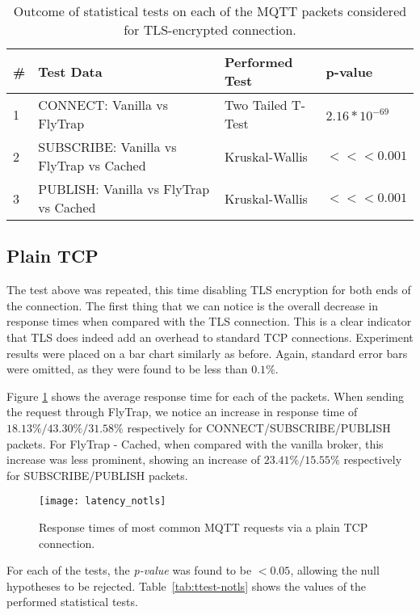 \begin{table}[h]
\centering
\begin{tabular}{|l|l|l|l|}
\hline
\textbf{\#} & \textbf{Test Data}                       & \textbf{Performed Test} & \textbf{p-value}                      \\ \hline
1           & CONNECT: Vanilla vs FlyTrap              & Two Tailed T-Test       & $2.16*10^{-69}$                    \\ \hline
2           & SUBSCRIBE: Vanilla vs FlyTrap vs Cached & Kruskal-Wallis          & $<<< 0.001$ \\ \hline
3           & PUBLISH: Vanilla vs FlyTrap vs Cached & Kruskal-Wallis          & $<<< 0.001$ \\ \hline
\end{tabular}
\caption{Outcome of statistical tests on each of the MQTT packets considered for TLS-encrypted connection.}
\label{tab:ttest-tls}
\end{table}

\subsection{Plain TCP}
The test above was repeated, this time disabling TLS encryption for both ends of the connection. The first thing that we can notice is the overall decrease in response times when compared with the TLS connection. This is a clear indicator that TLS does indeed add an overhead to standard TCP connections. Experiment results were placed on a bar chart similarly as before. Again, standard error bars were omitted, as they were found to be less than $0.1\%$.

Figure \ref{fig:latency_notls} shows the average response time for each of the packets. When sending the request through FlyTrap, we notice an increase in response time of $18.13\%/43.30\%/31.58\%$ respectively for CONNECT/SUBSCRIBE/PUBLISH packets. For FlyTrap - Cached, when compared with the vanilla broker, this increase was less prominent, showing an increase of $23.41\%/15.55\%$ respectively for SUBSCRIBE/PUBLISH packets. 

\begin{figure}[h]
    \centering
    \texttt{[image: latency\_notls]}
    \caption{Response times of most common MQTT requests via a plain TCP connection.}
    \label{fig:latency_notls}
\end{figure}

For each of the tests, the \textit{p-value} was found to be $<0.05$, allowing the null hypotheses to be rejected. Table\ \ref{tab:ttest-notls} shows the values of the performed statistical tests.

